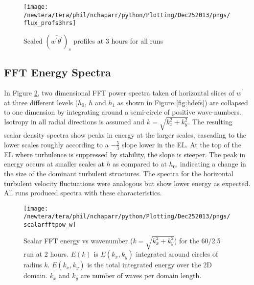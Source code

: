 \begin{figure}[htbp]
    \centering
    \texttt{[image: /newtera/tera/phil/nchaparr/python/Plotting/Dec252013/pngs/flux\_profs3hrs]}
    \caption{Scaled $(\overline{w^{'}\theta^{'}})_{s}$ profiles at 3 hours for all runs}
    \label{fig:fluxprofs2hrs}   %
\end{figure}

\clearpage

\subsection{FFT Energy Spectra}
\FloatBarrier

In Figure \ref{fig:scalarfftw602point5}, two dimensional \acs{FFT} power spectra taken of horizontal slices of $w^{\prime}$ at three different levels ($h_{0}$, $h$ and $h_{1}$ as shown in Figure \ref{fig:hdefs}) are collapsed to one dimension by integrating around a semi-circle of positive wave-numbers.
Isotropy in all radial directions is assumed and $k = \sqrt{k_{x}^{2} + k_{y}^{2}}$.  The resulting scalar density spectra show peaks in energy at the larger scales, cascading to the lower scales roughly according to a $-\frac{5}{3}$ slope lower in the \acs{EL}.  At
the top of the \acs{EL} where turbulence is suppressed by stability, the slope is steeper.  The peak in energy occurs at smaller scales
at $h$ as compared to at $h_{0}$, indicating a change in the size of the dominant turbulent structures. The spectra for the horizontal
turbulent velocity fluctuations were analogous but show lower energy as expected.  All runs produced spectra with these characteristics.\\

\begin{figure}[htbp]
    \centering
    \texttt{[image: /newtera/tera/phil/nchaparr/python/Plotting/Dec252013/pngs/scalarfftpow\_w]}
    \caption[\acs{FFT} energy spectra at heights $h_{0}$, $h$ and $h_{1}$ of $w^{'}$]{Scalar FFT  energy vs wavenumber ($k = \sqrt{k_{x}^{2}+k_{y}^{2}}$) for the 60/2.5 run
at 2 hours.  $E(k)$ is $E(k_{x}, k_{y})$ integrated around circles of radius $k$.  
   $E(k_{x}, k_{y})$ is the total integrated energy over the 2D domain.  
   $k_{x}$ and $k_{y}$ are number of waves per domain length.}
   \label{fig:scalarfftw602point5}   %
\end{figure}



